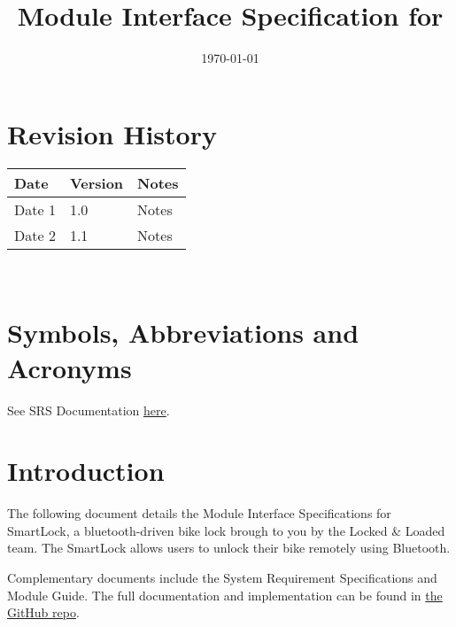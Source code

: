 \documentclass[12pt, titlepage]{article}
\begin{document}
\title{Module Interface Specification for \progname{}}

\author{\authname}

\date{\today}

\maketitle


\section{Revision History}

\begin{tabularx}{\textwidth}{p{3cm}p{2cm}X}
\toprule {\bf Date} & {\bf Version} & {\bf Notes}\\
\midrule
Date 1 & 1.0 & Notes\\
Date 2 & 1.1 & Notes\\
\bottomrule
\end{tabularx}

~\newpage

\section{Symbols, Abbreviations and Acronyms}

See SRS Documentation \href{https://github.com/NevoAbigail/Capstone/blob/main/docs/SRS/SRS.pdf}{here}.


\newpage

\tableofcontents

\newpage


\section{Introduction}

The following document details the Module Interface Specifications for
SmartLock, a bluetooth-driven bike lock brough to you by the Locked \& Loaded team. The SmartLock allows users to unlock their bike remotely using Bluetooth. 


Complementary documents include the System Requirement Specifications
and Module Guide.  The full documentation and implementation can be
found in \href{https://github.com/NevoAbigail/Capstone}{the GitHub repo}. %
\end{document}
